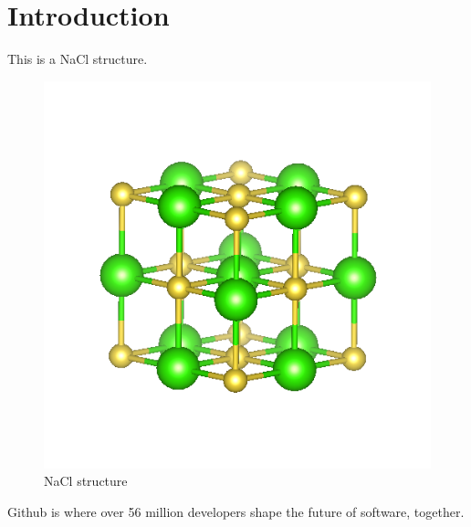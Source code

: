\section{Introduction}\label{sec:introduction}

This is a NaCl structure\cite{kipf2016semi}.
\begin{figure}[H]
  \centering
  \includegraphics[width=0.6\columnwidth]{./fig/NaCl.png}
  \caption{NaCl structure}
\end{figure}

Github is where over 56 million developers shape the future of software, together.
